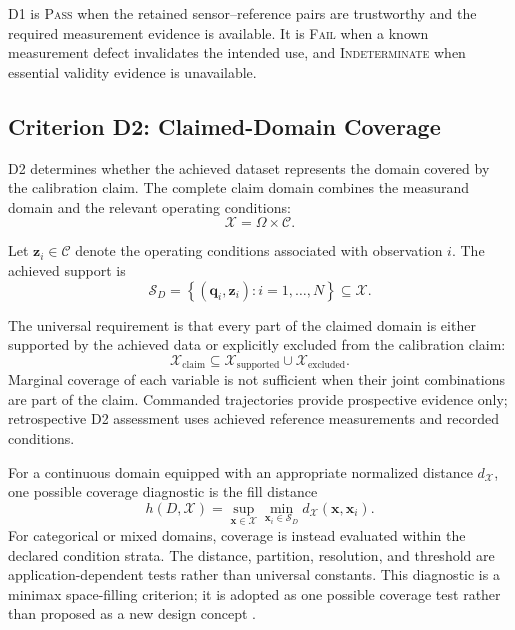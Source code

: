 \documentclass[11pt,a4paper]{article}
\begin{document}
D1 is \textsc{Pass} when the retained sensor--reference pairs are trustworthy
and the required measurement evidence is available. It is \textsc{Fail} when
a known measurement defect invalidates the intended use, and
\textsc{Indeterminate} when essential validity evidence is unavailable.

\subsection{Criterion D2: Claimed-Domain Coverage}

D2 determines whether the achieved dataset represents the domain covered by
the calibration claim. The complete claim domain combines the measurand domain
and the relevant operating conditions:
\begin{equation}
    \mathcal{X}
    =
    \Omega\times\mathcal{C}.
\end{equation}

Let $\mathbf{z}_i\in\mathcal{C}$ denote the operating conditions associated
with observation $i$. The achieved support is
\begin{equation}
    \mathcal{S}_D
    =
    \left\{
        \left(\mathbf{q}_i,\mathbf{z}_i\right)
        :
        i=1,\ldots,N
    \right\}
    \subseteq
    \mathcal{X}.
\end{equation}

The universal requirement is that every part of the claimed domain is either
supported by the achieved data or explicitly excluded from the calibration
claim:
\begin{equation}
    \mathcal{X}_{\mathrm{claim}}
    \subseteq
    \mathcal{X}_{\mathrm{supported}}
    \cup
    \mathcal{X}_{\mathrm{excluded}}.
\end{equation}
Marginal coverage of each variable is not sufficient when their joint
combinations are part of the claim. Commanded trajectories provide prospective
evidence only; retrospective D2 assessment uses achieved reference
measurements and recorded conditions.

For a continuous domain equipped with an appropriate normalized distance
$d_{\mathcal{X}}$, one possible coverage diagnostic is the fill distance
\begin{equation}
    h(D,\mathcal{X})
    =
    \sup_{\mathbf{x}\in\mathcal{X}}
    \min_{\mathbf{x}_i\in\mathcal{S}_D}
    d_{\mathcal{X}}(\mathbf{x},\mathbf{x}_i).
\end{equation}
For categorical or mixed domains, coverage is instead evaluated within the
declared condition strata. The distance, partition, resolution, and threshold
are application-dependent tests rather than universal constants. This
diagnostic is a minimax space-filling criterion; it is adopted as one possible
coverage test rather than proposed as a new design concept
\cite{pronzato2017}.
\end{document}
